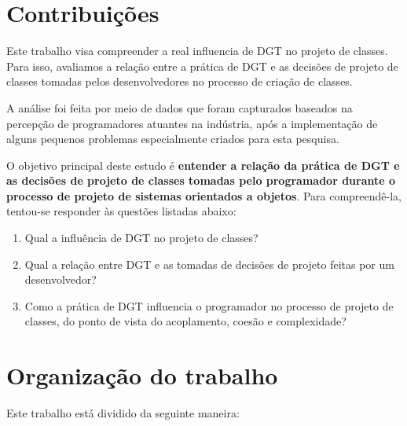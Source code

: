 \section{Contribuições}

Este trabalho
visa compreender a real influencia de DGT no projeto de classes.
Para isso, avaliamos a relação entre a prática de 
DGT
e as decisões de projeto de classes tomadas pelos desenvolvedores no processo de 
criação de classes.

A análise foi feita por meio de dados que foram
capturados baseados na percepção de programadores atuantes na indústria, após
a implementação de alguns pequenos problemas especialmente criados para
esta pesquisa.

O objetivo principal deste estudo é \textbf{entender a relação da prática de DGT 
e as decisões de projeto de classes tomadas pelo programador durante o processo de 
projeto de sistemas orientados a objetos}.
Para compreendê-la, tentou-se responder às questões listadas
abaixo:

\begin{enumerate}

	\item Qual a influência de DGT no projeto de classes?

	\item Qual a relação entre DGT e as tomadas de decisões de projeto
	feitas por um desenvolvedor?

	\item Como a prática de DGT influencia o programador no processo de  
	projeto de classes, do ponto de vista do acoplamento, coesão e complexidade?

\end{enumerate}

\section{Organização do trabalho}

Este trabalho está dividido da seguinte maneira: 

